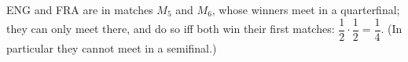 ENG and FRA are in matches $M_5$ and $M_6$, whose winners meet in a quarterfinal; they can only meet there, and do so iff both win their first matches: $\dfrac12\cdot\dfrac12=\boxed{\dfrac14}$. (In particular they cannot meet in a semifinal.)

